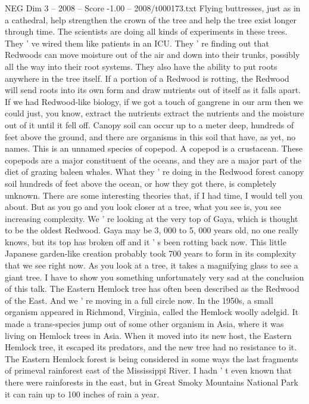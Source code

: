 \begin{textsample}{NEG Dim 3 – 2008 – Score -1.00 – 2008/t000173.txt}
Flying buttresses, just as in a cathedral, help strengthen the crown of the tree and help the tree exist longer through time.
The scientists are doing all kinds of experiments in these trees.
They ' ve wired them like patients in an ICU.
They ' re finding out that Redwoods can move moisture out of the air and down into their trunks, possibly all the way into their root systems.
They also have the ability to put roots anywhere in the tree itself.
If a portion of a Redwood is rotting, the Redwood will send roots into its own form and draw nutrients out of itself as it falls apart.
If we had Redwood-like biology, if we got a touch of gangrene in our arm then we could just, you know, extract the nutrients extract the nutrients and the moisture out of it until it fell off.
Canopy soil can occur up to a meter deep, hundreds of feet above the ground, and there are organisms in this soil that have, as yet, no names.
This is an unnamed species of copepod.
A copepod is a crustacean.
These copepods are a major constituent of the oceans, and they are a major part of the diet of grazing baleen whales.
What they ' re doing in the Redwood forest canopy soil hundreds of feet above the ocean, or how they got there, is completely unknown.
There are some interesting theories that, if I had time, I would tell you about.
But as you go and you look closer at a tree, what you see is, you see increasing complexity.
We ' re looking at the very top of Gaya, which is thought to be the oldest Redwood.
Gaya may be 3, 000 to 5, 000 years old, no one really knows, but its top has broken off and it ' s been rotting back now.
This little Japanese garden-like creation probably took 700 years to form in its complexity that we see right now.
As you look at a tree, it takes a magnifying glass to see a giant tree.
I have to show you something unfortunately very sad at the conclusion of this talk.
The Eastern Hemlock tree has often been described as the Redwood of the East.
And we ' re moving in a full circle now.
In the 1950s, a small organism appeared in Richmond, Virginia, called the Hemlock woolly adelgid.
It made a trans-species jump out of some other organism in Asia, where it was living on Hemlock trees in Asia.
When it moved into its new host, the Eastern Hemlock tree, it escaped its predators, and the new tree had no resistance to it.
The Eastern Hemlock forest is being considered in some ways the last fragments of primeval rainforest east of the Mississippi River.
I hadn ' t even known that there were rainforests in the east, but in Great Smoky Mountains National Park it can rain up to 100 inches of rain a year.

\end{textsample}
